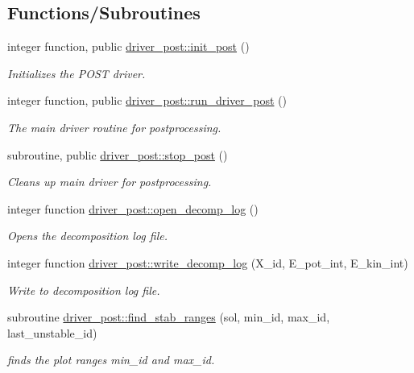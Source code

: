 \subsection*{Functions/\+Subroutines}
\begin{DoxyCompactItemize}
\item 
integer function, public \hyperlink{namespacedriver__post_aedfc4aff721a615c776a555c399eb8aa}{driver\+\_\+post\+::init\+\_\+post} ()
\begin{DoxyCompactList}\small\item\em Initializes the P\+O\+ST driver. \end{DoxyCompactList}\item 
integer function, public \hyperlink{namespacedriver__post_a1d9c6d7e46d9e49cdc84c4c21772039c}{driver\+\_\+post\+::run\+\_\+driver\+\_\+post} ()
\begin{DoxyCompactList}\small\item\em The main driver routine for postprocessing. \end{DoxyCompactList}\item 
subroutine, public \hyperlink{namespacedriver__post_ac045ebc85c68c3a94b3fafa3b89ccdc3}{driver\+\_\+post\+::stop\+\_\+post} ()
\begin{DoxyCompactList}\small\item\em Cleans up main driver for postprocessing. \end{DoxyCompactList}\item 
integer function \hyperlink{namespacedriver__post_a5d76f87f131e21b4d74fd5f4a7bbbd6b}{driver\+\_\+post\+::open\+\_\+decomp\+\_\+log} ()
\begin{DoxyCompactList}\small\item\em Opens the decomposition log file. \end{DoxyCompactList}\item 
integer function \hyperlink{namespacedriver__post_a4981c6c0e63b862c92ba240f43e22e77}{driver\+\_\+post\+::write\+\_\+decomp\+\_\+log} (X\+\_\+id, E\+\_\+pot\+\_\+int, E\+\_\+kin\+\_\+int)
\begin{DoxyCompactList}\small\item\em Write to decomposition log file. \end{DoxyCompactList}\item 
subroutine \hyperlink{namespacedriver__post_a51ecad1032e415d2a8e6e5b97d2c7e09}{driver\+\_\+post\+::find\+\_\+stab\+\_\+ranges} (sol, min\+\_\+id, max\+\_\+id, last\+\_\+unstable\+\_\+id)
\begin{DoxyCompactList}\small\item\em finds the plot ranges {\ttfamily min\+\_\+id} and {\ttfamily max\+\_\+id}. \end{DoxyCompactList}\item 

\end{DoxyCompactItemize}

